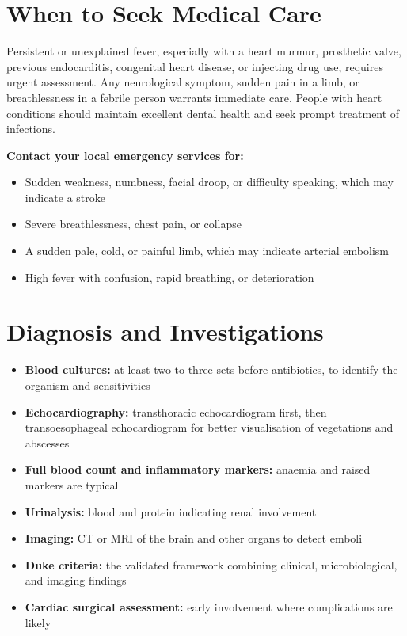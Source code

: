 \section*{When to Seek Medical Care}
Persistent or unexplained fever, especially with a heart murmur, prosthetic valve, previous endocarditis, congenital heart disease, or injecting drug use, requires urgent assessment. Any neurological symptom, sudden pain in a limb, or breathlessness in a febrile person warrants immediate care. People with heart conditions should maintain excellent dental health and seek prompt treatment of infections.

\textbf{Contact your local emergency services for:}
\begin{itemize}
    \item Sudden weakness, numbness, facial droop, or difficulty speaking, which may indicate a stroke
    \item Severe breathlessness, chest pain, or collapse
    \item A sudden pale, cold, or painful limb, which may indicate arterial embolism
    \item High fever with confusion, rapid breathing, or deterioration
\end{itemize}

\section*{Diagnosis and Investigations}
\begin{itemize}
    \item \textbf{Blood cultures:} at least two to three sets before antibiotics, to identify the organism and sensitivities
    \item \textbf{Echocardiography:} transthoracic echocardiogram first, then transoesophageal echocardiogram for better visualisation of vegetations and abscesses
    \item \textbf{Full blood count and inflammatory markers:} anaemia and raised markers are typical
    \item \textbf{Urinalysis:} blood and protein indicating renal involvement
    \item \textbf{Imaging:} CT or MRI of the brain and other organs to detect emboli
    \item \textbf{Duke criteria:} the validated framework combining clinical, microbiological, and imaging findings
    \item \textbf{Cardiac surgical assessment:} early involvement where complications are likely
\end{itemize}

